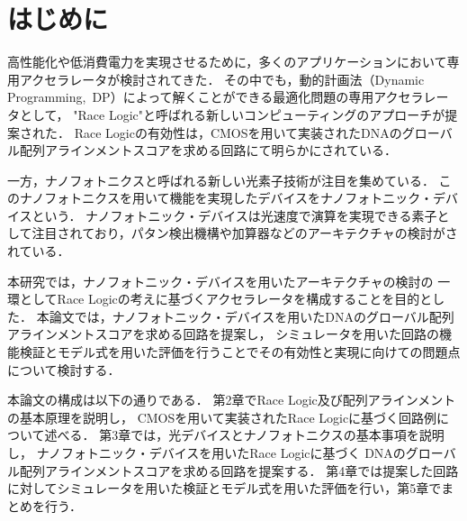 \chapter{はじめに}
高性能化や低消費電力を実現させるために，多くのアプリケーションにおいて専用アクセラレータが検討されてきた．
その中でも，動的計画法（Dynamic Programming, DP）によって解くことができる最適化問題の専用アクセラレータとして，
"Race Logic"と呼ばれる新しいコンピューティングのアプローチが提案された\cite{madhavan2014race}．
Race Logicの有効性は，CMOSを用いて実装されたDNAのグローバル配列アラインメントスコアを求める回路にて明らかにされている．

一方，ナノフォトニクスと呼ばれる新しい光素子技術が注目を集めている．
このナノフォトニクスを用いて機能を実現したデバイスをナノフォトニック・デバイスという．
ナノフォトニック・デバイスは光速度で演算を実現できる素子として注目されており，パタン検出機構や加算器などのアーキテクチャの検討がされている．

本研究では，ナノフォトニック・デバイスを用いたアーキテクチャの検討の
一環としてRace Logicの考えに基づくアクセラレータを構成することを目的とした．
本論文では，ナノフォトニック・デバイスを用いたDNAのグローバル配列アラインメントスコアを求める回路を提案し，
シミュレータを用いた回路の機能検証とモデル式を用いた評価を行うことでその有効性と実現に向けての問題点について検討する．

本論文の構成は以下の通りである．
第2章でRace Logic及び配列アラインメントの基本原理を説明し，
CMOSを用いて実装されたRace Logicに基づく回路例について述べる．
第3章では，光デバイスとナノフォトニクスの基本事項を説明し，
ナノフォトニック・デバイスを用いたRace Logicに基づく
DNAのグローバル配列アラインメントスコアを求める回路を提案する．
第4章では提案した回路に対してシミュレータを用いた検証とモデル式を用いた評価を行い，第5章でまとめを行う．


